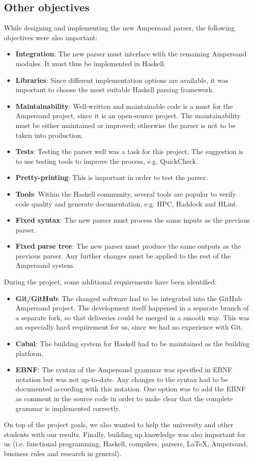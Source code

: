
\subsection{Other objectives}
While designing and implementing the new Ampersand parser, the following objectives were also important:
\begin{itemize}
  \item \textbf{Integration}: The new parser must interface with the remaining Ampersand modules.
    It must thus be implemented in Haskell.
  \item \textbf{Libraries}: Since different implementation options are available, it was important to choose the most suitable Haskell parsing framework.
  \item \textbf{Maintainability}: Well-written and maintainable code is a must for the Ampersand project, since it is an open-source project.
    The maintainability must be either maintained or improved; otherwise the parser is not to be taken into production.
  \item \textbf{Tests}: Testing the parser well was a task for this project.
    The suggestion is to use testing tools to improve the process, e.g. QuickCheck.
  \item \textbf{Pretty-printing}: This is important in order to test the parser.
%
%
%
  \item \textbf{Tools}: Within the Haskell community, several tools are popular to verify code quality and generate documentation, e.g. HPC, Haddock and HLint.
  \item \textbf{Fixed syntax}: The new parser must process the same inputs as the previous parser.
  \item \textbf{Fixed parse tree}: The new parser must produce the same outputs as the previous parser.
    Any further changes must be applied to the rest of the Ampersand system.
\end{itemize}

During the project, some additional requirements have been identified:
\begin{itemize}
  \item \textbf{Git/GitHub}: The changed software had to be integrated into the GitHub Ampersand project.
    The development itself happened in a separate branch of a separate fork, so that deliveries could be merged in a smooth way.
    This was an especially hard requirement for us, since we had no experience with Git.
  \item \textbf{Cabal}: The building system for Haskell had to be maintained as the building platform.
  \item \textbf{EBNF}: The syntax of the Ampersand grammar was specified in EBNF notation but was not up-to-date.
    Any changes to the syntax had to be documented according with this notation.
    One option was to add the EBNF as comment in the source code in order to make clear that the complete grammar is implemented correctly.
\end{itemize}

On top of the project goals, we also wanted to help the university and other students with our results.
Finally, building up knowledge was also important for us (i.e. functional programming, Haskell, compilers, parsers, LaTeX, Ampersand, business rules and research in general).
